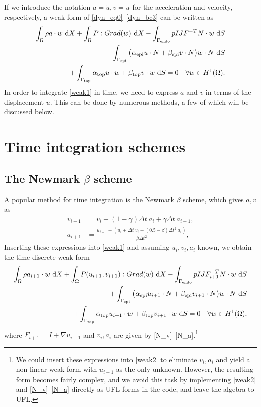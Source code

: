 \documentclass[a4paper,10pt]{article}
\newcommand{\dif}{\mathop{}\!\mathrm{d}}
\newcommand{\dX}{\dif{}X}
\newcommand{\dS}{\dif{}S}
\begin{document}
If we introduce the notation $a= \ddot{u}, v=\dot{u}$
for the acceleration and velocity, respectively, a weak form
of \eqref{dyn_eq0}--\eqref{dyn_bc3} can be written as
\begin{equation}
\begin{aligned}
\int_{\Omega} \rho a \cdot w \, \dX + \int_{\Omega} P:Grad(w) \, \dX -\int_{\Gamma_{\rm endo}} p I JF^{-T}N \cdot w \, \dS  \\
+\int_{\Gamma_{\rm epi}} \big(\alpha_{\rm epi} u \cdot N + \beta_{\rm epi} v \cdot N \big) w \cdot N \, \dS  \\
+\int_{\Gamma_{\rm top}} \alpha_{\rm top} u \cdot w + \beta_{\rm top} v \cdot w \, \dS = 0 \quad \forall w \in H^1(\Omega).
\end{aligned}\label{weak1}
\end{equation}
In order to integrate \eqref{weak1} in time, we need to express $a$ and $v$ in
terms of the displacement $u$. This can be done by numerous methods, a few of
which will be discussed below.

\section{Time integration schemes}
\subsection{The Newmark $\beta$ scheme}
A popular method for time integration is the Newmark $\beta$ scheme,
which gives $a,v$ as
\begin{align}
v_{i+1} &= v_i + (1-\gamma) \Delta t ~ a_i + \gamma \Delta t ~ a_{i+1}, \label{N_v}\\
a_{i+1} &= \frac{u_{i+1} - (u_i + \Delta t ~ v_i + (0.5 - \beta) \Delta t^2 ~ a_i)}{\beta \Delta t^2}, \label{N_a}
\end{align}
Inserting these expressions into \eqref{weak1} and assuming $u_i,v_i,a_i$ known,
we obtain the time discrete weak form
\begin{equation}
\begin{aligned}
\int_{\Omega} \rho a_{i+1} \cdot w \, \dX + \int_{\Omega} P(u_{i+1},v_{i+1}):Grad(w) \, \dX -\int_{\Gamma_{\rm endo}} p I JF_{i+1}^{-T}N \cdot w \, \dS  \\
+\int_{\Gamma_{\rm epi}} \big(\alpha_{\rm epi} u_{i+1} \cdot N + \beta_{\rm epi} v_{i+1} \cdot N \big) w \cdot N \, \dS  \\
+\int_{\Gamma_{\rm top}} \alpha_{\rm top} u_{i+1} \cdot w + \beta_{\rm top} v_{i+1} \cdot w \, \dS = 0 \quad \forall w \in H^1(\Omega),
\end{aligned}\label{weak2}
\end{equation}
where $F_{i+1} = I + \nabla u_{i+1}$ and $v_i,a_i$ are given by
\eqref{N_v}--\eqref{N_a}.\footnote{We could insert these expressions into \eqref{weak2} to eliminate $v_i,a_i$
and yield a non-linear weak form with $u_{i+1}$ as the only unknown. However, the
resulting form becomes fairly complex, and we avoid this task by implementing \eqref{weak2} and
\eqref{N_v}--\eqref{N_a} directly as UFL forms in the code, and leave the algebra to UFL.}
\end{document}
